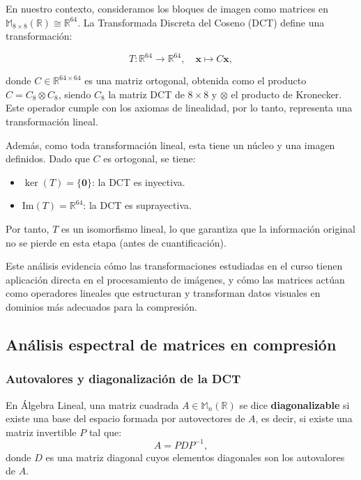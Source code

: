 \documentclass[8pt,a4paper]{article}
\theoremstyle{definition}
\theoremstyle{remark}
\begin{document}
\begin{multicols}{2}
            En nuestro contexto, consideramos los bloques de imagen como matrices en \( \mathbb{M}_{8 \times 8}(\mathbb{R}) \cong \mathbb{R}^{64} \). La Transformada Discreta del Coseno (DCT) define una transformación:
            
            \[
            T: \mathbb{R}^{64} \longrightarrow \mathbb{R}^{64}, \quad \mathbf{x} \mapsto C \mathbf{x},
            \]
            
            donde \( C \in \mathbb{R}^{64 \times 64} \) es una matriz ortogonal, obtenida como el producto \( C = C_8 \otimes C_8 \), siendo \( C_8 \) la matriz DCT de \( 8 \times 8 \) y \( \otimes \) el producto de Kronecker. Este operador cumple con los axiomas de linealidad, por lo tanto, representa una transformación lineal.
            
            Además, como toda transformación lineal, esta tiene un núcleo y una imagen definidos. Dado que \( C \) es ortogonal, se tiene:
            
            \begin{itemize}
                \item \( \ker(T) = \{\mathbf{0}\} \): la DCT es inyectiva.
                \item \( \text{Im}(T) = \mathbb{R}^{64} \): la DCT es suprayectiva.
            \end{itemize}
            
            Por tanto, \( T \) es un isomorfismo lineal, lo que garantiza que la información original no se pierde en esta etapa (antes de cuantificación).
            
            Este análisis evidencia cómo las transformaciones estudiadas en el curso tienen aplicación directa en el procesamiento de imágenes, y cómo las matrices actúan como operadores lineales que estructuran y transforman datos visuales en dominios más adecuados para la compresión.

        \subsection{Análisis espectral de matrices en compresión}

            \subsubsection{Autovalores y diagonalización de la DCT}

            En Álgebra Lineal, una matriz cuadrada \( A \in \mathbb{M}_n(\mathbb{R}) \) se dice \textbf{diagonalizable} si existe una base del espacio formada por autovectores de \( A \), es decir, si existe una matriz invertible \( P \) tal que:
            \[
            A = P D P^{-1},
            \]
            donde \( D \) es una matriz diagonal cuyos elementos diagonales son los autovalores de \( A \).


\end{multicols}
\end{document}
